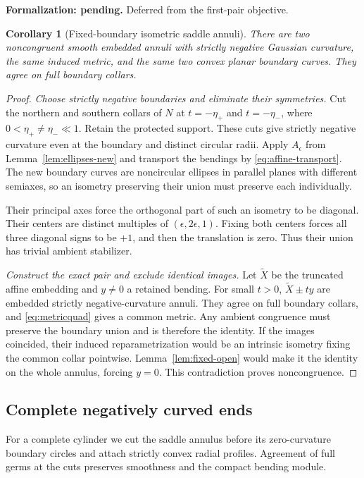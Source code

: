 \documentclass[11pt]{amsart}
\newtheorem{corollary}[theorem]{Corollary}
\theoremstyle{definition}
\theoremstyle{remark}
\numberwithin{equation}{section}
\begin{document}
\par\noindent\textbf{Formalization: pending.} Deferred from the first-pair objective.\par
\begin{corollary}[Fixed-boundary isometric saddle annuli]
\label{cor:fixed-boundary-annuli}
There are two noncongruent smooth embedded annuli with strictly negative
Gaussian curvature, the same induced metric, and the same two convex
planar boundary curves. They agree on full boundary collars.
\end{corollary}
\begin{proof}
\emph{Choose strictly negative boundaries and eliminate their symmetries.}
Cut the northern and southern collars of $N$ at $t=-\eta_+$ and
$t=-\eta_-$, where $0<\eta_+\ne\eta_-\ll1$. Retain the protected
support. These cuts give strictly negative curvature even at the boundary
and distinct circular radii. Apply $A_\epsilon$ from
Lemma~\ref{lem:ellipses-new} and transport the bendings by
\eqref{eq:affine-transport}. The new boundary curves are noncircular
ellipses in parallel planes with different semiaxes, so an isometry
preserving their union must preserve each individually.

Their principal axes force the orthogonal part of such an isometry to
be diagonal. Their centers are distinct multiples of
$(\epsilon,2\epsilon,1)$. Fixing both centers forces all three diagonal
signs to be $+1$, and then the translation is zero. Thus their union
has trivial ambient stabilizer.

\emph{Construct the exact pair and exclude identical images.}
Let $\widetilde X$ be the truncated affine embedding and $y\ne0$ a
retained bending. For small $t>0$, $\widetilde X\pm ty$ are embedded
strictly negative-curvature annuli. They agree on full boundary collars,
and \eqref{eq:metricquad} gives a common metric.
Any ambient congruence must preserve the boundary union and is therefore
the identity. If the images coincided, their induced reparametrization
would be an intrinsic isometry fixing the common collar pointwise.
Lemma~\ref{lem:fixed-open} would make it the identity on the whole annulus,
forcing $y=0$. This contradiction proves noncongruence.
\end{proof}

\subsection{Complete negatively curved ends}\label{sec:complete-cylinder}
For a complete cylinder we cut the saddle annulus before its zero-curvature
boundary circles and attach strictly convex radial profiles. Agreement of
full germs at the cuts preserves smoothness and the compact bending module.
\end{document}
